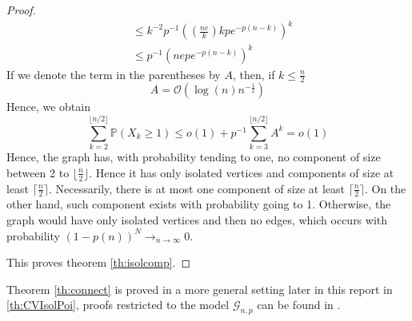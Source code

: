 \begin{proof}
\begin{align}
			   &\leq k^{-2}p^{-1}((\frac{ne}{k}) k p e^{-p(n-k)})^k\\
			   &\leq p^{-1}(nep e^{-p(n-k)})^k
\end{align}
If we denote the term in the parentheses by $A$, then, if $k \leq \frac{n}{2}$
\begin{equation}
    A = \mathcal{O}(\log(n) n^{-\frac{1}{2}})
\end{equation}
Hence, we obtain
\begin{equation}
	\sum_{k=2}^{\lfloor n/2\rfloor} \mathbb{P}(X_k \geq 1)\leq o(1) + p^{-1}\sum_{k=3}^{\lfloor n/2\rfloor} A^k = o(1)
\end{equation}
Hence, the graph has, with probability tending to one, no component of size between 2 to $\lfloor \frac{n}{2} \rfloor$.
Hence it has only isolated vertices and components of size at least $\lceil \frac{n}{2} \rceil$.
Necessarily, there is at most one component of size at least $\lceil \frac{n}{2} \rceil$.
\newline
On the other hand, such component exists with probability going to 1. Otherwise, the graph would have only isolated vertices and then no edges, which occurs with probability $(1-p(n))^N \longrightarrow_{n\to \infty} 0$.

This proves theorem \eqref{th:isolcomp}.
\end{proof}

Theorem \eqref{th:connect} is proved in a more general setting later in this report in \ref{th:CVIsolPoi}, proofs restricted to the model $\mathcal{G}_{n,p}$ can be found in \cite{JLR}.


